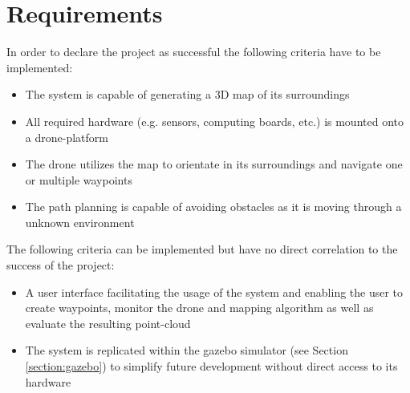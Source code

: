 \section{Requirements}
In order to declare the project as successful the following criteria have to be implemented:
\begin{itemize}
	\item The system is capable of generating a 3D map of its surroundings
	\item All required hardware (e.g. sensors, computing boards, etc.) is mounted onto a drone-platform 
	\item The drone utilizes the map to orientate in its surroundings and navigate one or multiple waypoints
	\item The path planning is capable of avoiding obstacles as it is moving through a unknown environment
\end{itemize}

The following criteria can be implemented but have no direct correlation to the success of the project:
\begin{itemize}
	\item A user interface facilitating the usage of the system and enabling the user to create waypoints, monitor the drone and mapping algorithm as well as evaluate the resulting point-cloud
	\item The system is replicated within the gazebo simulator (see Section \ref{section:gazebo}) to simplify future development without direct access to its hardware
\end{itemize}


\filbreak
